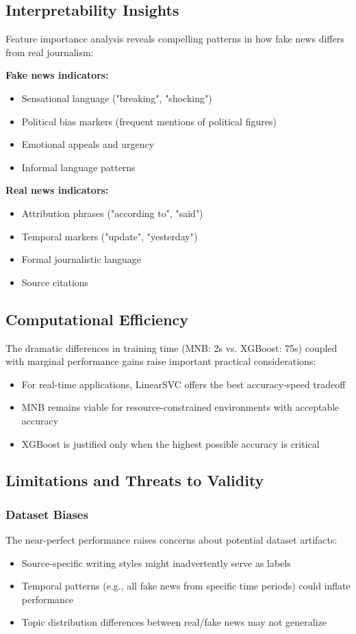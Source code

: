 \documentclass[11pt]{article}
\begin{document}
\subsection{Interpretability Insights}
Feature importance analysis reveals compelling patterns in how fake news differs from real journalism:

\textbf{Fake news indicators:}
\begin{itemize}
\item Sensational language ("breaking", "shocking")
\item Political bias markers (frequent mentions of political figures)
\item Emotional appeals and urgency
\item Informal language patterns
\end{itemize}

\textbf{Real news indicators:}
\begin{itemize}
\item Attribution phrases ("according to", "said")
\item Temporal markers ("update", "yesterday")
\item Formal journalistic language
\item Source citations
\end{itemize}

\subsection{Computational Efficiency}
The dramatic differences in training time (MNB: 2s vs. XGBoost: 75s) coupled with marginal performance gains raise important practical considerations:
\begin{itemize}
\item For real-time applications, LinearSVC offers the best accuracy-speed tradeoff
\item MNB remains viable for resource-constrained environments with acceptable accuracy
\item XGBoost is justified only when the highest possible accuracy is critical
\end{itemize}

\subsection{Limitations and Threats to Validity}

\subsubsection{Dataset Biases}
The near-perfect performance raises concerns about potential dataset artifacts:
\begin{itemize}
\item Source-specific writing styles might inadvertently serve as labels
\item Temporal patterns (e.g., all fake news from specific time periods) could inflate performance
\item Topic distribution differences between real/fake news may not generalize
\end{itemize}
\end{document}
